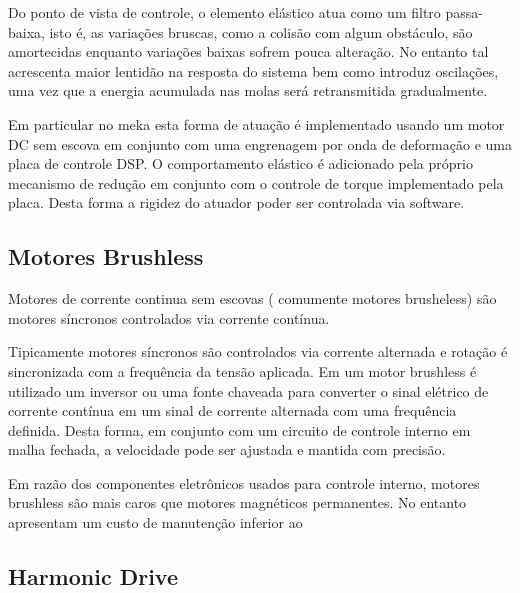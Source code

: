 Do ponto de vista de controle, o elemento elástico atua como um filtro passa-baixa, isto é, as variações bruscas, como a colisão com algum obstáculo, são amortecidas enquanto variações baixas sofrem pouca alteração. No entanto tal acrescenta maior lentidão na resposta do sistema bem como introduz oscilações, uma vez que a energia acumulada nas molas será retransmitida gradualmente.

Em particular no meka esta forma de atuação é implementado usando um motor DC sem escova em conjunto com uma engrenagem por onda de deformação e uma placa de controle DSP. O comportamento elástico é adicionado pela próprio mecanismo de redução em conjunto com o controle de torque implementado pela placa. Desta forma a rigidez do atuador poder ser controlada via software.

\subsection{Motores Brushless}

Motores de corrente continua sem escovas ( comumente motores brusheless) são motores síncronos controlados via corrente contínua.

Tipicamente motores síncronos são controlados via corrente alternada e rotação é sincronizada com a frequência da tensão aplicada. Em um motor brushless é utilizado um inversor ou uma fonte chaveada para converter o sinal elétrico de corrente contínua em um sinal de corrente alternada com uma frequência definida. Desta forma, em conjunto com um circuito de controle interno em malha fechada, a velocidade pode ser ajustada e mantida com precisão. \cite{nobody}

Em razão dos componentes eletrônicos usados para controle interno, motores brushless são mais caros que motores magnéticos permanentes. No entanto apresentam um custo de manutenção inferior ao


\subsection{Harmonic Drive}

